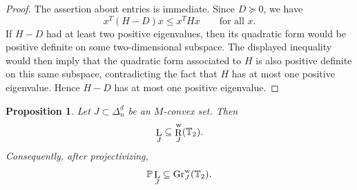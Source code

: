 \documentclass[12pt]{amsart}
\newtheorem{proposition}[theorem]{Proposition}
\theoremstyle{definition}
\newcommand{\1}{\mathbf{1}}
\DeclareMathOperator{\upL}{L}   %
\DeclareMathOperator{\upR}{R}   %
\newcommand\mb{\texorpdfstring{\textbf{Matt:} }{Matt: }}
\newcommand\ol{\texorpdfstring{\textbf{Oliver:} }{Oliver: }}
\begin{document}
\begin{proof}
The assertion about entries is immediate.  Since $D\succeq 0$, we have
\[
        x^T(H-D)x \le x^T Hx
        \qquad\text{for all }x.
\]
If $H-D$ had at least two positive eigenvalues, then its quadratic form would
be positive definite on some two-dimensional subspace.  The displayed
inequality would then imply that the quadratic form associated to $H$ is also
positive definite on this same subspace, contradicting the fact that $H$ has
at most one positive eigenvalue.  Hence $H-D$ has at most one positive
eigenvalue.
\end{proof}


\begin{proposition}
\label{prop:unnormalized-upper-containment}
Let $J\subset \Delta_n^d$ be an $M$-convex set. Then
\[
\upL_J\subseteq \upR_J^{\rm w}(\mathbb T_2).
\]
Consequently, after projectivizing,
\[
\mathbb P \upL_J\subseteq \operatorname{Gr}_J^{\rm w}(\mathbb T_2).
\]
\end{proposition}
\end{document}
